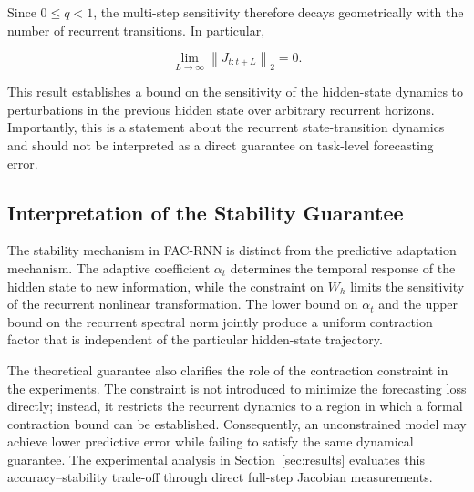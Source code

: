 \documentclass[journal]{IEEEtran}
\begin{document}
	Since $0\leq q<1$, the multi-step sensitivity therefore decays geometrically with the number of recurrent transitions. In particular,
	
	\begin{equation}
		\lim_{L\rightarrow\infty}
		\left\lVert J_{t:t+L}\right\rVert_2
		=
		0.
		\label{eq:asymptotic_jacobian}
	\end{equation}
	
	This result establishes a bound on the sensitivity of the hidden-state dynamics to perturbations in the previous hidden state over arbitrary recurrent horizons. Importantly, this is a statement about the recurrent state-transition dynamics and should not be interpreted as a direct guarantee on task-level forecasting error.
	
	
	\subsection{Interpretation of the Stability Guarantee}
	\label{subsec:stability_interpretation}
	
	The stability mechanism in FAC-RNN is distinct from the predictive adaptation mechanism. The adaptive coefficient $\alpha_t$ determines the temporal response of the hidden state to new information, while the constraint on $W_h$ limits the sensitivity of the recurrent nonlinear transformation. The lower bound on $\alpha_t$ and the upper bound on the recurrent spectral norm jointly produce a uniform contraction factor that is independent of the particular hidden-state trajectory.
	
	The theoretical guarantee also clarifies the role of the contraction constraint in the experiments. The constraint is not introduced to minimize the forecasting loss directly; instead, it restricts the recurrent dynamics to a region in which a formal contraction bound can be established. Consequently, an unconstrained model may achieve lower predictive error while failing to satisfy the same dynamical guarantee. The experimental analysis in Section~\ref{sec:results} evaluates this accuracy--stability trade-off through direct full-step Jacobian measurements.
	
\end{document}

